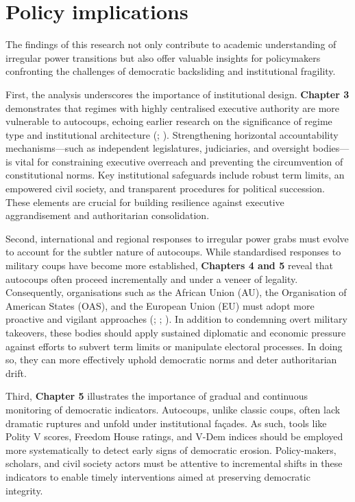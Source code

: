 \documentclass[
  12pt,
]{report}
\begin{document}
\section{Policy implications}\label{policy-implications-1}

The findings of this research not only contribute to academic
understanding of irregular power transitions but also offer valuable
insights for policymakers confronting the challenges of democratic
backsliding and institutional fragility.

First, the analysis underscores the importance of institutional design.
\textbf{Chapter 3} demonstrates that regimes with highly centralised
executive authority are more vulnerable to autocoups, echoing earlier
research on the significance of regime type and institutional
architecture (;
). Strengthening
horizontal accountability mechanisms---such as independent legislatures,
judiciaries, and oversight bodies---is vital for constraining executive
overreach and preventing the circumvention of constitutional norms. Key
institutional safeguards include robust term limits, an empowered civil
society, and transparent procedures for political succession. These
elements are crucial for building resilience against executive
aggrandisement and authoritarian consolidation.

Second, international and regional responses to irregular power grabs
must evolve to account for the subtler nature of autocoups. While
standardised responses to military coups have become more established,
\textbf{Chapters 4 and 5} reveal that autocoups often proceed
incrementally and under a veneer of legality. Consequently,
organisations such as the African Union (AU), the Organisation of
American States (OAS), and the European Union (EU) must adopt more
proactive and vigilant approaches (;
;
). In addition to
condemning overt military takeovers, these bodies should apply sustained
diplomatic and economic pressure against efforts to subvert term limits
or manipulate electoral processes. In doing so, they can more
effectively uphold democratic norms and deter authoritarian drift.

Third, \textbf{Chapter 5} illustrates the importance of gradual and
continuous monitoring of democratic indicators. Autocoups, unlike
classic coups, often lack dramatic ruptures and unfold under
institutional façades. As such, tools like Polity V scores, Freedom
House ratings, and V-Dem indices should be employed more systematically
to detect early signs of democratic erosion. Policy-makers, scholars,
and civil society actors must be attentive to incremental shifts in
these indicators to enable timely interventions aimed at preserving
democratic integrity.
\end{document}
